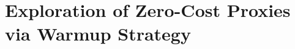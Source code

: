 \begin{comment}
\subsection{Theoretical Foundation}

Noen tanker her:
- Warmup som det blir referert til her blir ikke brukt slik i artikkelen som det står
"Generally speaking, by warmup we mean using the zero-cost proxies at the beginning of the search
process to initialize the search algorithm without training any models or using accuracy"
Warmup, originally used in neural network training, refers to the gradual increase of the learning rate during the initial training phase, which aids in achieving better convergence and stabilizing training dynamics \autocite{GoyalDGNWKTJH17}. In \cite{abdelfattah2021zero}, warmup is referred to as using zeor-cost proxies at the start of the search without training any models or using any accuracy.  

The warmup concept has been adapted to zero-cost proxies by \autocite{abdelfattah2021zero} to improve performance estimation in \gls{NAS}.

The motivation behind applying warmup to zero-cost proxies in \gls{NAS} is to capitalize on early training dynamics to enhance the precision and dependability of performance estimation. This approach involves training the candidate architectures for a finite number of warmup epochs and computing the zero-cost proxies at each epoch. By pinpointing the optimal warmup point, the \gls{NAS} process can be steered towards more favorable architectures, subsequently minimizing search time and boosting overall efficiency.

The value of warmup in the realm of zero-cost proxies can be ascribed to several factors. Firstly, it facilitates the incorporation of early training dynamics into the performance estimation process, providing crucial insights into the potential performance of an architecture. Secondly, warmup allows for network performance estimation without fully training the networks, substantially alleviating the computational workload. Lastly, the warmup method emphasizes determining the epoch with the highest correlation between the zero-cost proxies and the final network performance, as measured by validation accuracy, leading to a more precise and reliable performance predictor.
\end{comment}

\section{Exploration of Zero-Cost Proxies via Warmup Strategy}
